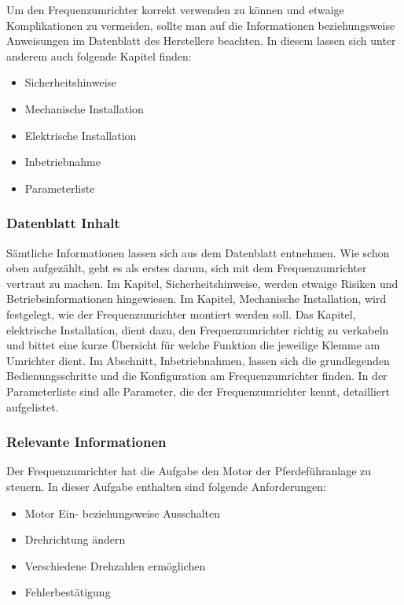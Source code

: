 Um den Frequenzumrichter korrekt verwenden zu können und etwaige Komplikationen zu vermeiden, sollte man auf die Informationen beziehungsweise Anweisungen im Datenblatt des Herstellers beachten. In diesem lassen sich unter anderem auch folgende Kapitel finden:

\begin{itemize}
	\item{Sicherheitshinweise}
	\item{Mechanische Installation}
	\item{Elektrische Installation}
	\item{Inbetriebnahme}
	\item{Parameterliste}
\end{itemize}

\subsubsection{Datenblatt Inhalt}
\label{sec:datenblattinhalt}

Sämtliche Informationen lassen sich aus dem Datenblatt entnehmen. Wie schon oben aufgezählt, geht es als erstes darum, sich mit dem Frequenzumrichter vertraut zu machen. Im  Kapitel, Sicherheitshinweise, werden etwaige Risiken und Betriebsinformationen hingewiesen. Im Kapitel, Mechanische Installation, wird festgelegt, wie der Frequenzumrichter montiert werden soll. Das Kapitel, elektrische Installation, dient dazu, den Frequenzumrichter richtig zu verkabeln und bittet eine kurze Übersicht für welche Funktion die jeweilige Klemme am Umrichter dient. Im Abschnitt, Inbetriebnahmen, lassen sich die grundlegenden Bedienungsschritte und die Konfiguration am Frequenzumrichter finden. In der Parameterliste sind alle Parameter, die der Frequenzumrichter kennt, detailliert aufgelistet.

\subsubsection{Relevante Informationen}
\label{sec:relevanteInformationen}

Der Frequenzumrichter hat die Aufgabe den Motor der Pferdeführanlage zu steuern. In dieser Aufgabe enthalten sind folgende Anforderungen:

\begin{itemize}
	\item{Motor Ein- beziehungsweise Ausschalten}
	\item{Drehrichtung ändern}
	\item{Verschiedene Drehzahlen ermöglichen}
	\item{Fehlerbestätigung}
\end{itemize}


